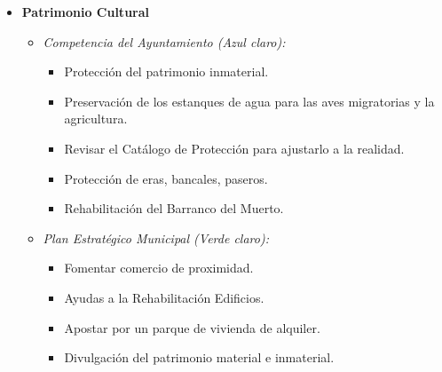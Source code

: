 \begin{itemize}
\begin{itemize}
        \item \textbf{Patrimonio Cultural}
        \begin{itemize}
            \item \textit{Competencia del Ayuntamiento (Azul claro):}
            \begin{itemize}
                \item Protección del patrimonio inmaterial.
                \item Preservación de los estanques de agua para las aves migratorias y la agricultura.
                \item Revisar el Catálogo de Protección para ajustarlo a la realidad.
                \item Protección de eras, bancales, paseros.
                \item Rehabilitación del Barranco del Muerto.
            \end{itemize}
            \item \textit{Plan Estratégico Municipal (Verde claro):}
            \begin{itemize}
                \item Fomentar comercio de proximidad.
                \item Ayudas a la Rehabilitación Edificios.
                \item Apostar por un parque de vivienda de alquiler.
                \item Divulgación del patrimonio material e inmaterial.
            \end{itemize}
        \end{itemize}


\end{itemize}
\end{itemize}
